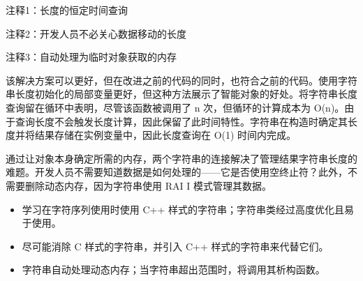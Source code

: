 {\footnotesize
注释1：长度的恒定时间查询

注释2：开发人员不必关心数据移动的长度

注释3：自动处理为临时对象获取的内存
}

该解决方案可以更好，但在改进之前的代码的同时，也符合之前的代码。使用字符串长度初始化的局部变量更好，但这种方法展示了智能对象的好处。将字符串长度查询留在循环中表明，尽管该函数被调用了 n 次，但循环的计算成本为 O(n)。由于查询长度不会触发长度计算，因此保留了此时间特性。字符串在构造时确定其长度并将结果存储在实例变量中，因此长度查询在 O(1) 时间内完成。

通过让对象本身确定所需的内存，两个字符串的连接解决了管理结果字符串长度的难题。开发人员不需要知道数据是如何处理的——它是否使用空终止符？此外，不需要删除动态内存，因为字符串使用 RAI I 模式管理其数据。


\begin{itemize}
\item
学习在字符序列使用时使用 C++ 样式的字符串；字符串类经过高度优化且易于使用。

\item
尽可能消除 C 样式的字符串，并引入 C++ 样式的字符串来代替它们。

\item
字符串自动处理动态内存；当字符串超出范围时，将调用其析构函数。
\end{itemize}

